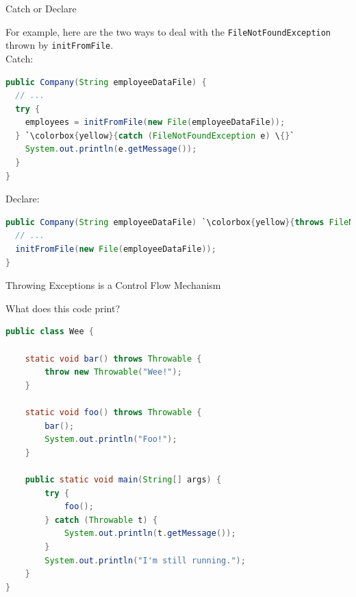 \documentclass{beamer}
\begin{document}
\begin{frame}[fragile]{Catch or Declare}


For example, here are the two ways to deal with the {\tt FileNotFoundException} thrown by {\tt initFromFile}.\\
\vspace{.1in}
Catch:
\vspace{-.05in}
\begin{lstlisting}[language=Java,escapechar=`]
public Company(String employeeDataFile) {
  // ...
  try {
    employees = initFromFile(new File(employeeDataFile));
  } `\colorbox{yellow}{catch (FileNotFoundException e) \{}`
    System.out.println(e.getMessage());
  }
}
\end{lstlisting}
Declare:
\vspace{-.05in}
\begin{lstlisting}[language=Java,escapechar=`]
public Company(String employeeDataFile) `\colorbox{yellow}{throws FileNotFoundException \{}`
  // ...
  initFromFile(new File(employeeDataFile));
}
\end{lstlisting}

\end{frame}

\begin{frame}[fragile]{Throwing Exceptions is a Control Flow Mechanism}


What does this code print?
\begin{lstlisting}[language=Java]
public class Wee {

    static void bar() throws Throwable {
        throw new Throwable("Wee!");
    }

    static void foo() throws Throwable {
        bar();
        System.out.println("Foo!");
    }

    public static void main(String[] args) {
        try {        
            foo();
        } catch (Throwable t) {
            System.out.println(t.getMessage());
        }
        System.out.println("I'm still running.");
    }
}
\end{lstlisting}

\end{frame}
\end{document}
